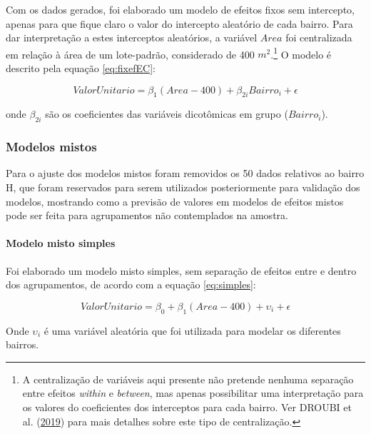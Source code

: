 \documentclass[
  a4paper, 12pt]{article}
\begin{document}
Com os dados gerados, foi elaborado um modelo de efeitos fixos sem
intercepto, apenas para que fique claro o valor do intercepto aleatório
de cada bairro. Para dar interpretação a estes interceptos aleatórios, a
variável \(Area\) foi centralizada em relação à área de um lote-padrão,
considerado de 400 \(m^2\).\footnote{A centralização de variáveis aqui
  presente não pretende nenhuma separação entre efeitos \emph{within} e
  \emph{between}, mas apenas possibilitar uma interpretação para os
  valores do coeficientes dos interceptos para cada bairro. Ver DROUBI
  et al. (\protect\hyperlink{ref-droubi2019}{2019}) para mais detalhes
  sobre este tipo de centralização.} O modelo é descrito pela equação
\ref{eq:fixefEC}:

\begin{equation} \label{eq:fixefEC}
ValorUnitario = \beta_1 (Area - 400) + \beta_{2i}Bairro_i + \epsilon
\end{equation}

onde \(\beta_{2i}\) são os coeficientes das variáveis dicotômicas em
grupo (\(Bairro_i\)).

\hypertarget{modelos-mistos}{%
\subsubsection{Modelos mistos}\label{modelos-mistos}}

Para o ajuste dos modelos mistos foram removidos os 50 dados relativos
ao bairro H, que foram reservados para serem utilizados posteriormente
para validação dos modelos, mostrando como a previsão de valores em
modelos de efeitos mistos pode ser feita para agrupamentos não
contemplados na amostra.

\hypertarget{modelo-misto-simples}{%
\paragraph{Modelo misto simples}\label{modelo-misto-simples}}

Foi elaborado um modelo misto simples, sem separação de efeitos entre e
dentro dos agrupamentos, de acordo com a equação \ref{eq:simples}:

\begin{equation} \label{eq:simples}
ValorUnitario = \beta_0 + \beta_1 (Area - 400) + \upsilon_i + \epsilon
\end{equation}

Onde \(\upsilon_i\) é uma variável aleatória que foi utilizada para
modelar os diferentes bairros.
\end{document}

